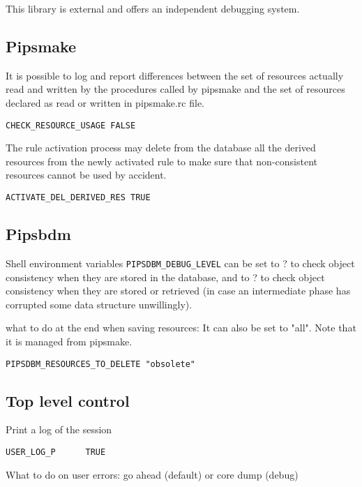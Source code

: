 This library is external and offers an independent debugging system.

\subsection{Pipsmake}

It is possible to log and report differences between the set of resources
actually read and written by the procedures called by pipsmake and the set
of resources declared as read or written in pipsmake.rc file.

\begin{verbatim}
CHECK_RESOURCE_USAGE FALSE
\end{verbatim}

The rule activation process may delete from the database all the
derived resources from the newly activated rule to make sure that
non-consistent resources cannot be used by accident.

\begin{verbatim}
ACTIVATE_DEL_DERIVED_RES TRUE
\end{verbatim}

\subsection{Pipsbdm}

Shell environment variables \verb+PIPSDBM_DEBUG_LEVEL+ can be set to ?
to check object consistency when they are stored in the database, and to
? to check object consistency when they are stored or retrieved (in case
an intermediate phase has corrupted some data structure unwillingly).

what to do at the end when saving resources: It can also be set to "all".
Note that it is managed from pipsmake.
\begin{verbatim}
PIPSDBM_RESOURCES_TO_DELETE "obsolete"
\end{verbatim}


\subsection{Top level control}

Print a log of the session

\begin{verbatim}
USER_LOG_P      TRUE
\end{verbatim}

What to do on user errors: go ahead (default) or core dump (debug)

